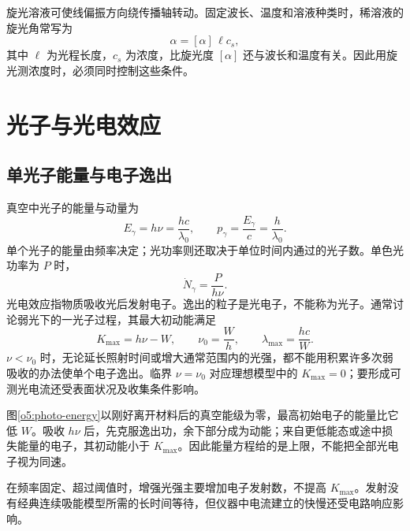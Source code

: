旋光溶液可使线偏振方向绕传播轴转动。固定波长、温度和溶液种类时，稀溶液的旋光角常写为
\[
 \alpha=[\alpha]\,\ell c_s,
\]
其中 \(\ell\) 为光程长度，\(c_s\) 为浓度，比旋光度 \([\alpha]\) 还与波长和温度有关。因此用旋光测浓度时，必须同时控制这些条件。

\section{光子与光电效应}

\subsection{单光子能量与电子逸出}

真空中光子的能量与动量为
\[
 E_\gamma=h\nu=\frac{hc}{\lambda_0},\qquad
 p_\gamma=\frac{E_\gamma}{c}=\frac h{\lambda_0}.
\]
单个光子的能量由频率决定；光功率则还取决于单位时间内通过的光子数。单色光功率为 \(P\) 时，
\[
 \dot N_\gamma=\frac{P}{h\nu}.
\]
光电效应指物质吸收光后发射电子。逸出的粒子是光电子，不能称为光子。通常讨论弱光下的一光子过程，其最大初动能满足
\[
 \boxed{K_{\max}=h\nu-W},\qquad
 \boxed{\nu_0=\frac Wh},\qquad
 \boxed{\lambda_{\max}=\frac{hc}{W}}.
\]
\(\nu<\nu_0\) 时，无论延长照射时间或增大通常范围内的光强，都不能用积累许多次弱吸收的办法使单个电子逸出。临界 \(\nu=\nu_0\) 对应理想模型中的 \(K_{\max}=0\)；要形成可测光电流还受表面状况及收集条件影响。

图\ref{o5:photo-energy}以刚好离开材料后的真空能级为零，最高初始电子的能量比它低 $W$。吸收 $h\nu$ 后，先克服逸出功，余下部分成为动能；来自更低能态或途中损失能量的电子，其初动能小于 $K_{\max}$。因此能量方程给的是上限，不能把全部光电子视为同速。

在频率固定、超过阈值时，增强光强主要增加电子发射数，不提高 \(K_{\max}\)。发射没有经典连续吸能模型所需的长时间等待，但仪器中电流建立的快慢还受电路响应影响。

